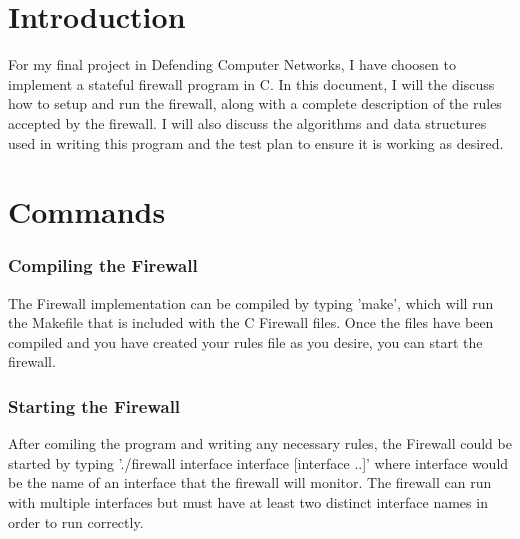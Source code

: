 \documentclass[12pt]{article} %
\begin{document}
\tableofcontents %

\newpage %


\section{Introduction} %
For my final project in Defending Computer Networks, I have choosen to implement a stateful firewall
program in C. In this document, I will the discuss how to setup and run the firewall, along with a complete 
description of the rules accepted by the firewall. I will also discuss the algorithms and data structures
used in writing this program and the test plan to ensure it is working as desired.


\section{Commands} %

\subsubsection{Compiling the Firewall} %
The Firewall implementation can be compiled by typing 'make', which will run the Makefile 
that is included with the C Firewall files. Once the files have been compiled and you have 
created your rules file as you desire, you can start the firewall.  

\subsubsection{Starting the Firewall} %
After comiling the program and writing any necessary rules, the Firewall could be started
by typing './firewall interface interface [interface ..]' where interface would be the name
of an interface that the firewall will monitor. The firewall can run with multiple interfaces 
but must have at least two distinct interface names in order to run correctly.

\end{document}
